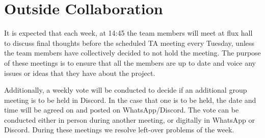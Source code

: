 \section{Outside Collaboration}It is expected that each week, at 14:45 the team members will meet at flux hall to discuss final thoughts before the scheduled TA meeting every Tuesday, unless the team members have collectively decided to not hold the meeting. The purpose of these meetings is to ensure that all the members are up to date and voice any issues or ideas that they have about the project. \par
\smallskip
Additionally, a weekly vote will be conducted to decide if an additional group meeting is to be held in Discord. In the case that one is to be held, the date and time will be agreed on and posted on WhatsApp/Discord. The vote can be conducted either in person during another meeting, or digitally in WhatsApp or Discord. During these meetings we resolve left-over problems of the week.\par
\smallskip

